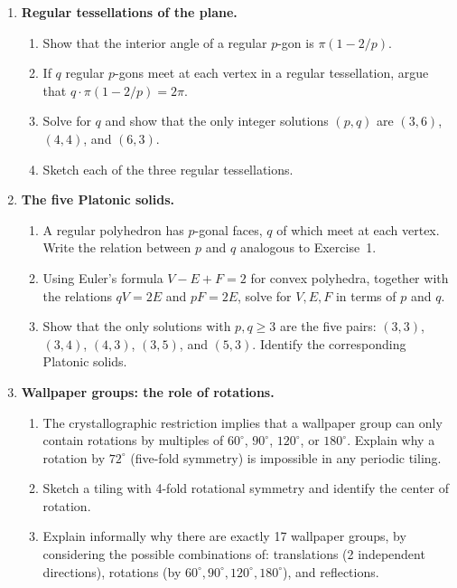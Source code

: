 \begin{enumerate}

    \item \textbf{Regular tessellations of the plane.}
    \begin{enumerate}
        \item Show that the interior angle of a regular $p$-gon is $\pi(1 - 2/p)$.
        \item If $q$ regular $p$-gons meet at each vertex in a regular tessellation, argue that $q \cdot \pi(1 - 2/p) = 2\pi$.
        \item Solve for $q$ and show that the only integer solutions $(p, q)$ are $(3, 6)$, $(4, 4)$, and $(6, 3)$.
        \item Sketch each of the three regular tessellations.
    \end{enumerate}

    \item \textbf{The five Platonic solids.}
    \begin{enumerate}
        \item A regular polyhedron has $p$-gonal faces, $q$ of which meet at each vertex. Write the relation between $p$ and $q$ analogous to Exercise~1.
        \item Using Euler's formula $V - E + F = 2$ for convex polyhedra, together with the relations $qV = 2E$ and $pF = 2E$, solve for $V, E, F$ in terms of $p$ and $q$.
        \item Show that the only solutions with $p, q \geq 3$ are the five pairs: $(3,3)$, $(3,4)$, $(4,3)$, $(3,5)$, and $(5,3)$. Identify the corresponding Platonic solids.
    \end{enumerate}

    \item \textbf{Wallpaper groups: the role of rotations.}
    \begin{enumerate}
        \item The crystallographic restriction implies that a wallpaper group can only contain rotations by multiples of $60^\circ$, $90^\circ$, $120^\circ$, or $180^\circ$. Explain why a rotation by $72^\circ$ (five-fold symmetry) is impossible in any periodic tiling.
        \item Sketch a tiling with 4-fold rotational symmetry and identify the center of rotation.
        \item Explain informally why there are exactly 17 wallpaper groups, by considering the possible combinations of: translations (2 independent directions), rotations (by $60^\circ, 90^\circ, 120^\circ, 180^\circ$), and reflections.
    \end{enumerate}


\end{enumerate}
